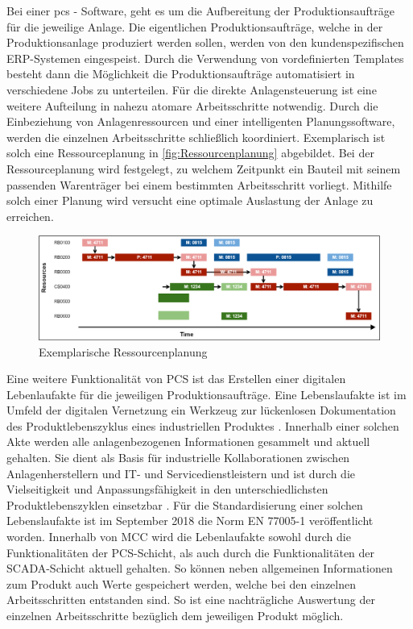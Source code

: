 Bei einer \gls{pcs} - Software, geht es um die Aufbereitung der Produktionsaufträge für die jeweilige Anlage. Die eigentlichen Produktionsaufträge, welche in der Produktionsanlage produziert werden sollen, werden von den kundenspezifischen ERP-Systemen eingespeist. Durch die Verwendung von vordefinierten Templates besteht dann die Möglichkeit die Produktionsaufträge automatisiert in verschiedene Jobs zu unterteilen. Für die direkte Anlagensteuerung ist eine weitere Aufteilung in nahezu atomare Arbeitsschritte notwendig. Durch die Einbeziehung von Anlagenressourcen und einer intelligenten Planungssoftware, werden die einzelnen Arbeitsschritte schließlich koordiniert. Exemplarisch ist solch eine Ressourceplanung in \autoref{fig:Ressourcenplanung} abgebildet. Bei der Ressourceplanung wird festgelegt, zu welchem Zeitpunkt ein Bauteil mit seinem passenden Warenträger bei einem bestimmten Arbeitsschritt vorliegt. Mithilfe solch einer Planung wird versucht eine optimale Auslastung der Anlage zu erreichen.

\begin{figure}[H]
    \centering
    \includegraphics[width=0.9\linewidth]{images/Ressourcenplanung.png}
    \caption{Exemplarische Ressourcenplanung \cite{EniscobyForcamGmbH.2021}\protect\footnotemark}
    \label{fig:Ressourcenplanung}
\end{figure}


Eine weitere Funktionalität von PCS ist das Erstellen einer digitalen Lebenlaufakte für die jeweiligen Produktionsaufträge. Eine Lebenslaufakte ist im Umfeld der digitalen Vernetzung ein Werkzeug zur lückenlosen Dokumentation des Produktlebenszyklus eines industriellen Produktes \cite{MaximilianAusterjost.2021}. Innerhalb einer solchen Akte werden alle anlagenbezogenen Informationen gesammelt und aktuell gehalten. Sie dient als Basis für industrielle Kollaborationen zwischen Anlagenherstellern und IT- und Servicedienstleistern und ist durch die Vielseitigkeit und Anpassungsfähigkeit in den unterschiedlichsten Produktlebenszyklen einsetzbar \cite{MaximilianAusterjost.2021}. Für die Standardisierung einer solchen Lebenslaufakte ist im September 2018 die Norm \glqq EN 77005-1\grqq{} veröffentlicht worden. Innerhalb von MCC wird die Lebenlaufakte sowohl durch die Funktionalitäten der PCS-Schicht, als auch durch die Funktionalitäten der SCADA-Schicht aktuell gehalten. So können neben allgemeinen Informationen zum Produkt auch Werte gespeichert werden, welche bei den einzelnen Arbeitsschritten entstanden sind. So ist eine nachträgliche Auswertung der einzelnen Arbeitsschritte bezüglich dem jeweiligen Produkt möglich.

